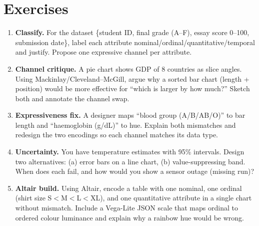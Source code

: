 \section{Exercises}
\label{sec:ch02-exercises}
\begin{enumerate}[label=E2.\arabic*, leftmargin=*, itemsep=0.8em]
    \item \textbf{Classify.} For the dataset \{student ID, final grade (A--F), essay score 0--100, submission date\}, label each attribute nominal/ordinal/quantitative/temporal and justify. Propose one expressive channel per attribute.
    \item \textbf{Channel critique.} A pie chart shows GDP of 8 countries as slice angles. Using Mackinlay/Cleveland--McGill, argue why a sorted bar chart (length + position) would be more effective for ``which is larger by how much?'' Sketch both and annotate the channel swap.
    \item \textbf{Expressiveness fix.} A designer maps ``blood group (A/B/AB/O)'' to bar length and ``haemoglobin (g/dL)'' to hue. Explain both mismatches and redesign the two encodings so each channel matches its data type.
    \item \textbf{Uncertainty.} You have temperature estimates with 95\% intervals. Design two alternatives: (a) error bars on a line chart, (b) value-suppressing band. When does each fail, and how would you show a sensor outage (missing run)?
    \item \textbf{Altair build.} Using Altair, encode a table with one nominal, one ordinal (shirt size S$<$M$<$L$<$XL), and one quantitative attribute in a single chart without mismatch. Include a Vega-Lite JSON scale that maps ordinal to ordered colour luminance and explain why a rainbow hue would be wrong.
\end{enumerate}
